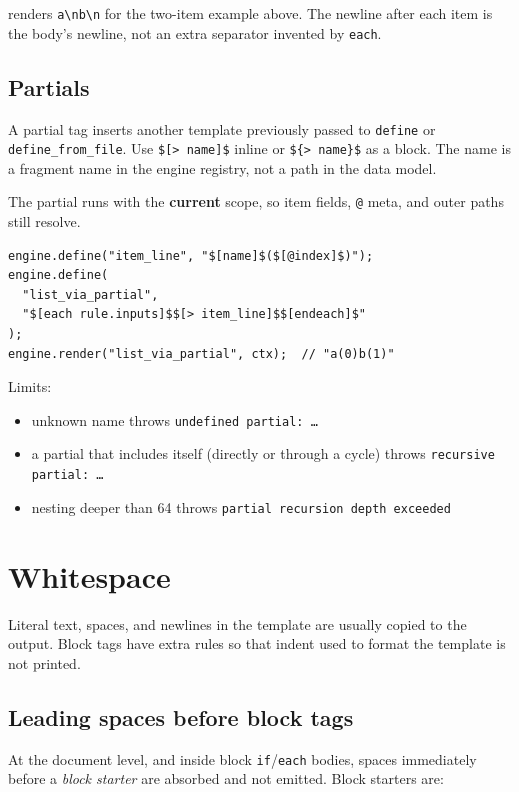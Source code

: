 \documentclass[11pt,letterpaper]{article}
\newcommand{\api}[1]{\texttt{#1}}
\begin{document}
renders \texttt{a\textbackslash nb\textbackslash n} for the two-item example
above. The newline after each item is the body's newline, not an extra
separator invented by \texttt{each}.

\subsection{Partials}

A partial tag inserts another template previously passed to
\api{define} or \api{define\_from\_file}. Use \texttt{\$[> name]\$} inline
or \texttt{\$\{> name\}\$} as a block. The name is a fragment name in the
engine registry, not a path in the data model.

The partial runs with the \textbf{current} scope, so item fields, \texttt{@}
meta, and outer paths still resolve.

\begin{lstlisting}
engine.define("item_line", "$[name]$($[@index]$)");
engine.define(
  "list_via_partial",
  "$[each rule.inputs]$$[> item_line]$$[endeach]$"
);
engine.render("list_via_partial", ctx);  // "a(0)b(1)"
\end{lstlisting}

Limits:

\begin{itemize}[nosep]
  \item unknown name throws \texttt{undefined partial: \ldots}
  \item a partial that includes itself (directly or through a cycle) throws
        \texttt{recursive partial: \ldots}
  \item nesting deeper than 64 throws
        \texttt{partial recursion depth exceeded}
\end{itemize}

\section{Whitespace}

Literal text, spaces, and newlines in the template are usually copied to the
output. Block tags have extra rules so that indent used to format the
template is not printed.

\subsection{Leading spaces before block tags}

At the document level, and inside block \texttt{if}/\texttt{each} bodies,
spaces immediately before a \emph{block starter} are absorbed and not
emitted. Block starters are:
\end{document}
